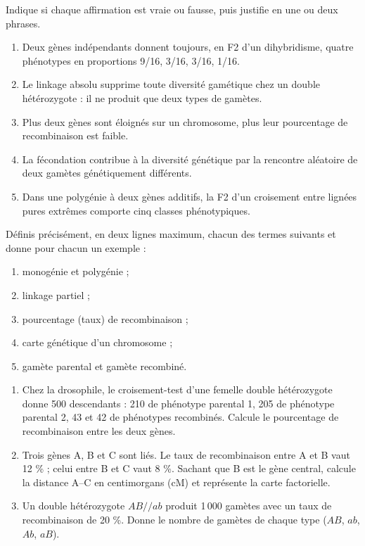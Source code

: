 \documentclass[11pt]{article}
\begin{document}
\begin{exercice}
Indique si chaque affirmation est vraie ou fausse, puis justifie en une ou deux phrases.
\begin{enumerate}
\item Deux gènes indépendants donnent toujours, en F2 d'un dihybridisme, quatre phénotypes en proportions 9/16, 3/16, 3/16, 1/16.
\item Le linkage absolu supprime toute diversité gamétique chez un double hétérozygote : il ne produit que deux types de gamètes.
\item Plus deux gènes sont éloignés sur un chromosome, plus leur pourcentage de recombinaison est faible.
\item La fécondation contribue à la diversité génétique par la rencontre aléatoire de deux gamètes génétiquement différents.
\item Dans une polygénie à deux gènes additifs, la F2 d'un croisement entre lignées pures extrêmes comporte cinq classes phénotypiques.
\end{enumerate}
\end{exercice}

\begin{exercice}
Définis précisément, en deux lignes maximum, chacun des termes suivants et donne pour chacun un exemple :
\begin{enumerate}
\item monogénie et polygénie ;
\item linkage partiel ;
\item pourcentage (taux) de recombinaison ;
\item carte génétique d'un chromosome ;
\item gamète parental et gamète recombiné.
\end{enumerate}
\end{exercice}

\begin{exercice}
\begin{enumerate}
\item Chez la drosophile, le croisement-test d'une femelle double hétérozygote donne 500 descendants : 210 de phénotype parental 1, 205 de phénotype parental 2, 43 et 42 de phénotypes recombinés. Calcule le pourcentage de recombinaison entre les deux gènes.
\item Trois gènes A, B et C sont liés. Le taux de recombinaison entre A et B vaut 12 \% ; celui entre B et C vaut 8 \%. Sachant que B est le gène central, calcule la distance A--C en centimorgans (cM) et représente la carte factorielle.
\item Un double hétérozygote $AB//ab$ produit 1\,000 gamètes avec un taux de recombinaison de 20 \%. Donne le nombre de gamètes de chaque type ($AB$, $ab$, $Ab$, $aB$).
\end{enumerate}
\end{exercice}
\end{document}
